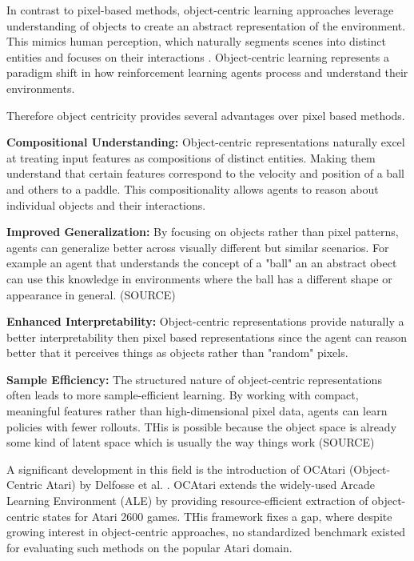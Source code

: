 \documentclass[
	english,
	ruledheaders=section,
	class=report,
	thesis={type=master},
	accentcolor=9c,
	custommargins=true,
	marginpar=false,
	parskip=half-,
	fontsize=11pt,
]{tudapub}
\begin{document}
In contrast to pixel-based methods, object-centric learning approaches leverage understanding of objects to create an abstract representation of the environment. This mimics human perception,
 which naturally segments scenes into distinct entities and focuses on their interactions \cite{nanbo2021learningobjectcentricrepresentationsmultiobject}. Object-centric learning represents a paradigm shift in how reinforcement learning agents process and understand their environments.

Therefore object centricity provides several advantages over pixel based methods.

\textbf{Compositional Understanding:} Object-centric representations naturally excel at treating input features as compositions of distinct entities. Making them understand that certain features
correspond to the velocity and position of a ball and others to a paddle. This compositionality allows agents to reason about individual objects and their interactions.

\textbf{Improved Generalization:} By focusing on objects rather than pixel patterns, agents can generalize better across visually different but similar scenarios. For example an agent that
 understands the concept of a "ball" an an abstract obect can use this knowledge in environments where the ball has a different shape or appearance in general. (SOURCE)

\textbf{Enhanced Interpretability:} Object-centric representations provide naturally a better interpretability then pixel based representations since the agent can reason better that it perceives things as objects rather than "random" pixels.

\textbf{Sample Efficiency:} The structured nature of object-centric representations often leads to more sample-efficient learning. By working with compact, meaningful features rather than high-dimensional
 pixel data, agents can learn policies with fewer rollouts. THis is possible because the object space is already some kind of latent space which is usually the way things work (SOURCE)

A significant development in this field is the introduction of OCAtari (Object-Centric Atari) by Delfosse et al. \cite{delfosse2024ocatariobjectcentricatari2600}. OCAtari extends the widely-used Arcade
 Learning Environment (ALE) by providing resource-efficient extraction of object-centric states for Atari 2600 games. THis framework fixes a gap, where despite growing interest in object-centric approaches,
no standardized benchmark existed for evaluating such methods on the popular Atari domain.
\end{document}
